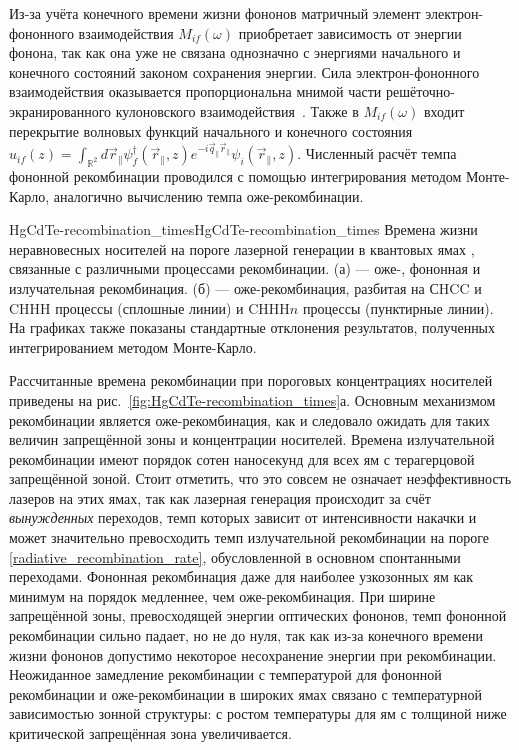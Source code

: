 Из-за учёта конечного времени жизни фононов матричный элемент электрон-фононного взаимодействия $M_{if}(\omega)$ приобретает зависимость от энергии фонона, так как она уже не связана однозначно с энергиями начального и конечного состояний законом сохранения энергии. Сила электрон-фононного взаимодействия оказывается пропорциональна мнимой части решёточно-экранированного кулоновского взаимодействия~\cite{phonon_through_kappa}. Также в $M_{if}(\omega)$ входит перекрытие волновых функций начального и конечного состояния $u_{if}(z) = \int_{\mathbb{R}^2} d\vec{r}_{\parallel} \psi_{f}^{\dagger}(\vec{r}_{\parallel},z)e^{-i\vec{q}_{\parallel}\vec{r}_{\parallel}}\psi_{i}(\vec{r}_{\parallel},z)$. Численный расчёт темпа фононной рекомбинации проводился с помощью интегрирования методом Монте-Карло, аналогично вычислению темпа оже-рекомбинации.

\begin{fig}{HgCdTe-recombination_times}{HgCdTe-recombination_times} Времена жизни неравновесных носителей на пороге лазерной генерации в квантовых ямах \HgCdTe{}, связанные с различными процессами рекомбинации. (а) --- оже-, фононная и излучательная рекомбинация. (б) --- оже-рекомбинация, разбитая на СHCC и CHHH процессы (сплошные линии) и CHHH$n$ процессы (пунктирные линии). На графиках также показаны стандартные отклонения результатов, полученных интегрированием методом Монте-Карло. 
\end{fig}

Рассчитанные времена рекомбинации при пороговых концентрациях носителей приведены на рис.~\ref{fig:HgCdTe-recombination_times}а. Основным механизмом рекомбинации является оже-рекомбинация, как и следовало ожидать для таких величин запрещённой зоны и концентрации носителей. Времена излучательной рекомбинации имеют порядок сотен наносекунд для всех ям с терагерцовой запрещённой зоной. Стоит отметить, что это совсем не означает неэффективность лазеров на этих ямах, так как лазерная генерация происходит за счёт \emph{вынужденных} переходов, темп которых зависит от интенсивности накачки и может значительно превосходить темп излучательной рекомбинации на пороге \eqref{radiative_recombination_rate}, обусловленной в основном спонтанными переходами. Фононная рекомбинация даже для наиболее узкозонных ям как минимум на порядок медленнее, чем оже-рекомбинация. При ширине запрещённой зоны, превосходящей энергии оптических фононов, темп фононной рекомбинации сильно падает, но не до нуля, так как из-за конечного времени жизни фононов допустимо некоторое несохранение энергии при рекомбинации. Неожиданное замедление рекомбинации с температурой для фононной рекомбинации и оже-рекомбинации в широких ямах связано с температурной зависимостью зонной структуры: с ростом температуры для ям с толщиной ниже критической запрещённая зона увеличивается.

